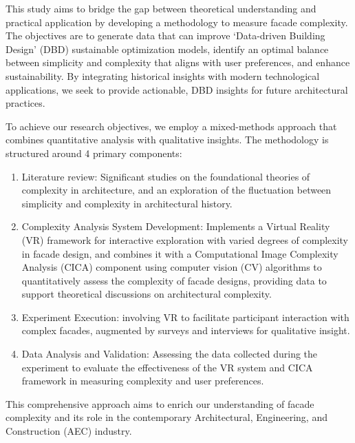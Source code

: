 This study aims to bridge the gap between theoretical understanding and practical application by developing a methodology to measure facade complexity.
The objectives are to generate data that can improve `Data-driven Building Design' (DBD) sustainable optimization models, identify an optimal balance between simplicity and complexity that aligns with user preferences, and enhance sustainability.
By integrating historical insights with modern technological applications, we seek to provide actionable, DBD insights for future architectural practices.

To achieve our research objectives, we employ a mixed-methods approach that combines quantitative analysis with qualitative insights.
The methodology is structured around 4 primary components:

\begin{enumerate}
    \item Literature review: Significant studies on the foundational theories of complexity in architecture, and an exploration of the fluctuation between simplicity and complexity in architectural history.
    \item Complexity Analysis System Development: Implements a Virtual Reality (VR) framework for interactive exploration with varied degrees of complexity in facade design, and combines it with a Computational Image Complexity Analysis (CICA) component using computer vision (CV) algorithms to quantitatively assess the complexity of facade designs, providing data to support theoretical discussions on architectural complexity.
    \item Experiment Execution: involving VR to facilitate participant interaction with complex facades, augmented by surveys and interviews for qualitative insight.
    \item Data Analysis and Validation: Assessing the data collected during the experiment to evaluate the effectiveness of the VR system and CICA framework in measuring complexity and user preferences.
\end{enumerate}

This comprehensive approach aims to enrich our understanding of facade complexity and its role in the contemporary Architectural, Engineering, and Construction (AEC) industry.







%
